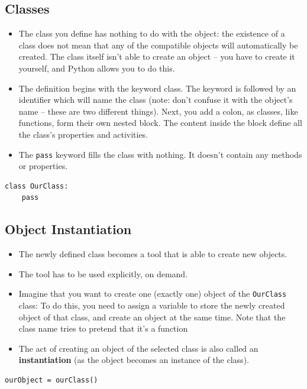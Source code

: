 \documentclass[11pt]{article}
\begin{document}
\subsection{Classes}
\label{sec:orgf3a1791}
\begin{itemize}
\item The class you define has nothing to do with the object: the
existence of a class does not mean that any of the compatible
objects will automatically be created. The class itself isn’t able
to create an object – you have to create it yourself, and Python
allows you to do this.
\item The definition begins with the keyword class. The keyword is
followed by an identifier which will name the class (note: don’t
confuse it with the object’s name – these are two different
things). Next, you add a colon, as classes, like functions, form
their own nested block. The content inside the block define all the
class’s properties and activities.
\item The \texttt{pass} keyword fills the class with nothing. It doesn’t contain
any methods or properties.
\end{itemize}

\begin{verbatim}
class OurClass:
    pass
\end{verbatim}

\subsection{Object Instantiation}
\label{sec:org4c36293}
\begin{itemize}
\item The newly defined class becomes a tool that is able to create new
objects.
\item The tool has to be used explicitly, on demand.
\item Imagine that you want to create one (exactly one) object of the
\texttt{OurClass} class: 
To do this, you need to assign a variable to store
the newly created object of that class, and create an object at the
same time. Note that the class name tries to pretend that it’s a
function
\item The act of creating an object of the selected class is also called
an \textbf{instantiation} (as the object becomes an instance of the class).
\end{itemize}

\begin{verbatim}
ourObject = ourClass()
\end{verbatim}
\end{document}
